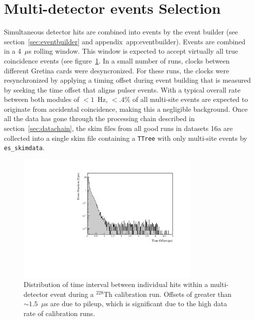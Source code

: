 \documentclass[notitlepage,rmp,aps,10pt]{revtex4-1}
\newcommand{\iso}[2]{$^{#1}$#2}
\newcommand{\Th}[1]{\iso{#1}{Th}}
\newcommand{\Md}{Multi-detector event}
\begin{document}
\section{\Md s Selection}
Simultaneous detector hits are combined into events by the event builder (see section~\ref{sec:eventbuilder} and appendix~{app:eventbuilder}).
Events are combined in a 4~$\mu$s rolling window.
This window is expected to accept virtually all true coincidence events (see figure~\ref{fig:toffset}.
In a small number of runs, clocks between different Gretina cards were desyncronized.
For these runs, the clocks were resynchronized by applying a timing offset during event building that is measured by seeking the time offset that aligns pulser events.
With a typical overall rate between both modules of $<1$~Hz, $<.4\%$ of all multi-site events are expected to originate from accidental coincidence, making this a negligible background.
Once all the data has gone through the processing chain described in section~\ref{sec:datachain}, the skim files from all good runs in datasets 1\-6a are collected into a single skim file containing a \texttt{TTree} with only multi-site events by \texttt{es\_skimdata}.
\\
\begin{figure}[ht]
  \centering
  \includegraphics[width=0.8\textwidth]{toffset}
  \caption[Distribution of offset times within multi-detector events]{\label{fig:toffset}
    Distribution of time interval between individual hits within a multi-detector event during a \Th{228} calibration run. Offsets of greater than $\sim1.5$~$\mu$s are due to pileup, which is significant due to the high data rate of calibration runs.}
\end{figure}
\end{document}
